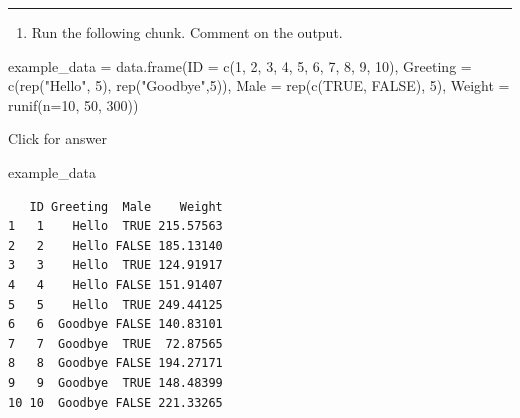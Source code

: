 \documentclass[
]{book}
\newenvironment{Shaded}{\begin{snugshade}}{\end{snugshade}}
\newcommand{\AttributeTok}[1]{\textcolor[rgb]{0.77,0.63,0.00}{#1}}
\newcommand{\ConstantTok}[1]{\textcolor[rgb]{0.00,0.00,0.00}{#1}}
\newcommand{\DecValTok}[1]{\textcolor[rgb]{0.00,0.00,0.81}{#1}}
\newcommand{\FunctionTok}[1]{\textcolor[rgb]{0.00,0.00,0.00}{#1}}
\newcommand{\NormalTok}[1]{#1}
\newcommand{\OtherTok}[1]{\textcolor[rgb]{0.56,0.35,0.01}{#1}}
\newcommand{\StringTok}[1]{\textcolor[rgb]{0.31,0.60,0.02}{#1}}
\providecommand{\tightlist}{%
  \setlength{\itemsep}{0pt}\setlength{\parskip}{0pt}}
\begin{document}
\begin{center}\rule{0.5\linewidth}{0.5pt}\end{center}

\begin{enumerate}
\def\labelenumi{\alph{enumi}.}
\tightlist
\item
  Run the following chunk. Comment on the output.
\end{enumerate}

\begin{Shaded}
\begin{Highlighting}[]
\NormalTok{example\_data }\OtherTok{=} \FunctionTok{data.frame}\NormalTok{(}\AttributeTok{ID =} \FunctionTok{c}\NormalTok{(}\DecValTok{1}\NormalTok{, }\DecValTok{2}\NormalTok{, }\DecValTok{3}\NormalTok{, }\DecValTok{4}\NormalTok{, }\DecValTok{5}\NormalTok{, }\DecValTok{6}\NormalTok{, }\DecValTok{7}\NormalTok{, }\DecValTok{8}\NormalTok{, }\DecValTok{9}\NormalTok{, }\DecValTok{10}\NormalTok{),}
                          \AttributeTok{Greeting =} \FunctionTok{c}\NormalTok{(}\FunctionTok{rep}\NormalTok{(}\StringTok{"Hello"}\NormalTok{, }\DecValTok{5}\NormalTok{), }\FunctionTok{rep}\NormalTok{(}\StringTok{"Goodbye"}\NormalTok{,}\DecValTok{5}\NormalTok{)),}
                          \AttributeTok{Male =} \FunctionTok{rep}\NormalTok{(}\FunctionTok{c}\NormalTok{(}\ConstantTok{TRUE}\NormalTok{, }\ConstantTok{FALSE}\NormalTok{), }\DecValTok{5}\NormalTok{),}
                          \AttributeTok{Weight =} \FunctionTok{runif}\NormalTok{(}\AttributeTok{n=}\DecValTok{10}\NormalTok{, }\DecValTok{50}\NormalTok{, }\DecValTok{300}\NormalTok{))}
\end{Highlighting}
\end{Shaded}

Click for answer

\begin{Shaded}
\begin{Highlighting}[]
\NormalTok{example\_data}
\end{Highlighting}
\end{Shaded}

\begin{verbatim}
   ID Greeting  Male    Weight
1   1    Hello  TRUE 215.57563
2   2    Hello FALSE 185.13140
3   3    Hello  TRUE 124.91917
4   4    Hello FALSE 151.91407
5   5    Hello  TRUE 249.44125
6   6  Goodbye FALSE 140.83101
7   7  Goodbye  TRUE  72.87565
8   8  Goodbye FALSE 194.27171
9   9  Goodbye  TRUE 148.48399
10 10  Goodbye FALSE 221.33265
\end{verbatim}
\end{document}
